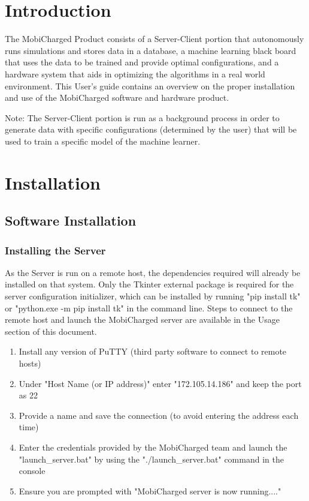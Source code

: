 \documentclass[12pt, titlepage]{article}
\begin{document}
\section{Introduction}
The MobiCharged Product consists of a Server-Client portion that autonomously runs simulations and stores data in a database, a machine learning black board that uses the data to be trained and provide optimal configurations, and a hardware system that aids in optimizing the algorithms in a real world environment. This User's guide contains an overview on the proper installation and use of the MobiCharged software and hardware product. 
\par
Note: The Server-Client portion is run as a background process in order to generate data with specific configurations (determined by the user) that will be used to train a specific model of the machine learner.

\section{Installation}
\subsection{Software Installation}
\subsubsection{Installing the Server}
As the Server is run on a remote host, the dependencies required will already be installed on that system. Only the Tkinter external package is required for the server configuration initializer, which can be installed by running "pip install tk" or "python.exe -m pip install tk" in the command line. Steps to connect to the remote host and launch the MobiCharged server are available in the Usage section of this document.
\begin{enumerate}
    \item Install any version of PuTTY (third party software to connect to remote hosts)
    \item Under "Host Name (or IP address)" enter "172.105.14.186" and keep the port as 22
    \item Provide a name and save the connection (to avoid entering the address each time)
    \item Enter the credentials provided by the MobiCharged team and launch the "launch\_server.bat" by using the "./launch\_server.bat" command in the console
    \item Ensure you are prompted with "MobiCharged server is now running...."
\end{enumerate}
\end{document}
